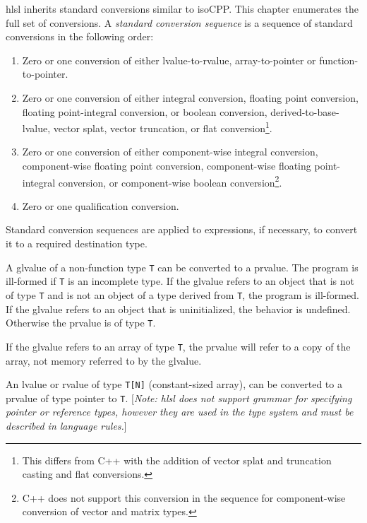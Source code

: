 
\p \acrshort{hlsl} inherits standard conversions similar to \gls{isoCPP}. This
chapter enumerates the full set of conversions. A \textit{standard conversion
sequence} is a sequence of standard conversions in the following
order:
\begin{enumerate}
  \item Zero or one conversion of either lvalue-to-rvalue, array-to-pointer or
  function-to-pointer.
  \item Zero or one conversion of either integral conversion, floating point
  conversion, floating point-integral conversion, or boolean conversion,
  derived-to-base-lvalue, vector splat, vector truncation, or flat
  conversion\footnote{This differs from C++ with the addition of
  vector splat and truncation casting and flat conversions.}.
  \item Zero or one conversion of either component-wise integral conversion,
  component-wise floating point conversion, component-wise floating
  point-integral conversion, or component-wise boolean
  conversion\footnote{C++ does not support this conversion in the sequence for
  component-wise conversion of vector and matrix types.}.
  \item Zero or one qualification conversion.
\end{enumerate}

Standard conversion sequences are applied to expressions, if necessary, to
convert it to a required destination type.


\p A glvalue of a non-function type \texttt{T} can be converted to a prvalue.
The program is ill-formed if \texttt{T} is an incomplete type. If the glvalue
refers to an object that is not of type \texttt{T} and is not an object of a
type derived from \texttt{T}, the program is ill-formed. If the glvalue refers to
an object that is uninitialized, the behavior is undefined. Otherwise the
prvalue is of type \texttt{T}.

\p If the glvalue refers to an array of type \texttt{T}, the prvalue will refer
to a copy of the array, not memory referred to by the glvalue.


\p An lvalue or rvalue of type \texttt{T[N]} (constant-sized array), can be
converted to a prvalue of type pointer to \texttt{T}.
[\textit{Note: \acrshort{hlsl} does not support grammar for specifying pointer or
reference types, however they are used in the type system and must be described
in language rules.}]

